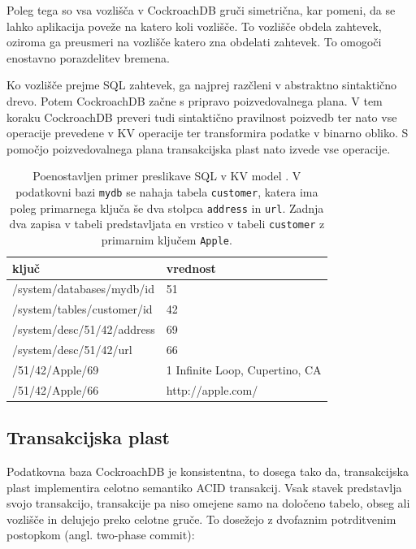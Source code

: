 \documentclass[a4paper, 12pt]{book}
\begin{document}
Poleg tega so vsa vozlišča v CockroachDB gruči simetrična, kar pomeni, da se lahko aplikacija poveže na katero koli vozlišče. To vozlišče obdela zahtevek, oziroma ga preusmeri na vozlišče katero zna obdelati zahtevek. To omogoči enostavno porazdelitev bremena.

Ko vozlišče prejme SQL zahtevek, ga najprej razčleni v abstraktno sintaktično drevo. Potem CockroachDB začne s pripravo poizvedovalnega plana. V tem koraku CockroachDB preveri tudi sintaktično pravilnost poizvedb ter nato vse operacije prevedene v KV operacije ter transformira podatke v binarno obliko. S pomočjo poizvedovalnega plana transakcijska plast nato izvede vse operacije.

\begin{table}[H]
\begin{center}
\begin{tabular}{ |l|l| } 
\hline
\textbf{ključ} & \textbf{vrednost} \\
\hline
/system/databases/mydb/id & 51 \\
/system/tables/customer/id & 42 \\ 
/system/desc/51/42/address & 69 \\ 
/system/desc/51/42/url & 66 \\
/51/42/Apple/69 & 1 Infinite Loop, Cupertino, CA \\
/51/42/Apple/66 & http://apple.com/ \\
\hline
\end{tabular}
\end{center}
\caption{Poenostavljen primer preslikave SQL v KV model \cite{CRDB-design}. V podatkovni bazi \texttt{mydb} se nahaja tabela \texttt{customer}, katera ima poleg primarnega ključa še dva stolpca \texttt{address} in \texttt{url}. Zadnja dva zapisa v tabeli predstavljata en vrstico v tabeli \texttt{customer} z primarnim ključem \texttt{Apple}.}
\label{tbl_crdb_sql_kv_mapping}
\end{table}

\subsection{Transakcijska plast}
Podatkovna baza CockroachDB je konsistentna, to dosega tako da, transakcijska plast implementira celotno semantiko ACID transakcij. Vsak stavek predstavlja svojo transakcijo, transakcije pa niso omejene samo na določeno tabelo, obseg ali vozlišče in delujejo preko celotne gruče. To dosežejo z dvofaznim potrditvenim postopkom (angl. two-phase commit):
\end{document}
